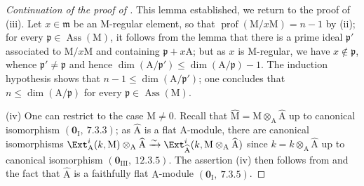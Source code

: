 \begin{proof}[Continuation of the proof of ]
This lemma established, we return to the proof of (iii).
Let $x\in\mathfrak{m}$ be an $\mathrm{M}$-regular element, so that $\operatorname{prof}(\mathrm{M}/x\mathrm{M})=n-1$ by (ii); for every $\mathfrak{p}\in\operatorname{Ass}(\mathrm{M})$, it follows from the lemma that there is a prime ideal $\mathfrak{p}'$ associated to $\mathrm{M}/x\mathrm{M}$ and containing $\mathfrak{p}+x\mathrm{A}$; but as $x$ is $\mathrm{M}$-regular, we have $x\notin\mathfrak{p}$, whence $\mathfrak{p}'\neq\mathfrak{p}$ and hence $\dim(\mathrm{A}/\mathfrak{p}')\leq\dim(\mathrm{A}/\mathfrak{p})-1$.
The induction hypothesis shows that $n-1\leq\dim(\mathrm{A}/\mathfrak{p}')$; one concludes that $n\leq\dim(\mathrm{A}/\mathfrak{p})$ for every $\mathfrak{p}\in\operatorname{Ass}(\mathrm{M})$.

(iv) One can restrict to the case $\mathrm{M}\neq 0$.
Recall that $\widehat{\mathrm{M}}=\mathrm{M}\otimes_\mathrm{A}\widehat{\mathrm{A}}$ up to canonical isomorphism $(\mathbf{0}_\mathrm{I},~7.3.3)$; as $\widehat{\mathrm{A}}$ is a flat $\mathrm{A}$-module, there are canonical isomorphisms $\Ext^i_\mathrm{A}(k,\mathrm{M})\otimes_\mathrm{A}\widehat{\mathrm{A}}\xrightarrow{\sim}\Ext^i_{\widehat{\mathrm{A}}}(k,\mathrm{M}\otimes_\mathrm{A}\widehat{\mathrm{A}})$ since $k=k\otimes_\mathrm{A}\widehat{\mathrm{A}}$ up to canonical isomorphism $(\mathbf{0}_\mathrm{III},~12.3.5)$.
The assertion (iv) then follows from  and the fact that $\widehat{\mathrm{A}}$ is a faithfully flat $\mathrm{A}$-module $(\mathbf{0}_\mathrm{I},~7.3.5)$.
\end{proof}

